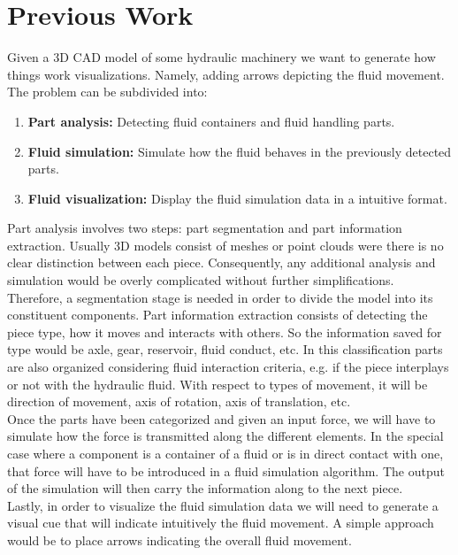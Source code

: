 \chapter{Previous Work}
\label{sec:prevWork}

Given a 3D CAD model of some hydraulic machinery we want to generate how things work visualizations.
Namely, adding arrows depicting the fluid movement.\\

The problem can be subdivided into:
\begin{enumerate}
\item \textbf{Part analysis:} Detecting fluid containers and fluid handling parts.
\item \textbf{Fluid simulation:} Simulate how the fluid behaves in the previously detected parts.
\item \textbf{Fluid visualization:} Display the fluid simulation data in a intuitive format.\\
\end{enumerate}

Part analysis involves two steps: part segmentation and part information extraction.
Usually 3D models consist of meshes or point clouds were there is no clear distinction between each piece.
Consequently, any additional analysis and simulation would be overly complicated without further simplifications.  
Therefore, a segmentation stage is needed in order to divide the model into its constituent components.
Part information extraction consists of detecting the piece type, how it moves and interacts with others.
So the information saved for type would be axle, gear, reservoir, fluid conduct, etc.
In this classification parts are also organized considering fluid interaction criteria, e.g. if the piece interplays or not with the hydraulic fluid.
With respect to types of movement, it will be direction of movement, axis of rotation, axis of translation, etc.\\

Once the parts have been categorized and given an input force, we will have to simulate how the force is transmitted along the different elements.
In the special case where a component is a container of a fluid or is in direct contact with one, that force will have to be introduced in a fluid simulation algorithm.
The output of the simulation will then carry the information along to the next piece.\\

Lastly, in order to visualize the fluid simulation data we will need to generate a visual cue that will indicate intuitively the fluid movement.
A simple approach would be to place arrows indicating the overall fluid movement.

